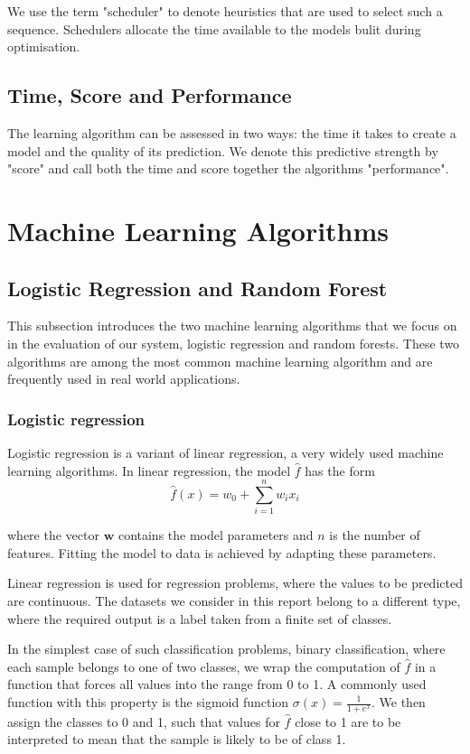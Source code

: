 \documentclass[a4paper,12pt,twoside,openright]{report}
\begin{document}
We use the term "scheduler" to denote heuristics that are used to select such a sequence. Schedulers allocate the time available to the models bulit during optimisation.

\subsection{Time, Score and Performance}
The learning algorithm can be assessed in two ways: the time it takes to create a model and the quality of its prediction. We denote this predictive strength by "score" and call both the time and score together the algorithms "performance".

\section{Machine Learning Algorithms}
\subsection{Logistic Regression and Random Forest}
This subsection introduces the two machine learning algorithms that we focus on in the evaluation of our system, logistic regression and random forests. These two algorithms are among the most common machine learning algorithm and are frequently used in real world applications.

\subsubsection{Logistic regression}
Logistic regression is a variant of linear regression, a very widely used machine learning algorithms. In linear regression, the model $\hat{f}$ has the form
\begin{equation}
\hat{f}(x) = w_0 + \sum_{i=1}^n w_ix_i
\end{equation}

where the vector $\mathbf{w}$ contains the model parameters and $n$ is the number of features. Fitting the model to data is achieved by adapting these parameters.

Linear regression is used for regression problems, where the values to be predicted are continuous. The datasets we consider in this report belong to a different type, where the required output is a label taken from a finite set of classes.

In the simplest case of such classification problems, binary classification, where each sample belongs to one of two classes, we wrap the computation of $\hat{f}$ in a function that forces all values into the range from 0 to 1. A commonly used function with this property is the sigmoid function $\sigma(x) = \frac{1}{1+e^x}$. We then assign the classes to 0 and 1, such that values for $\hat{f}$ close to 1 are to be interpreted to mean that the sample is likely to be of class 1.
\end{document}

